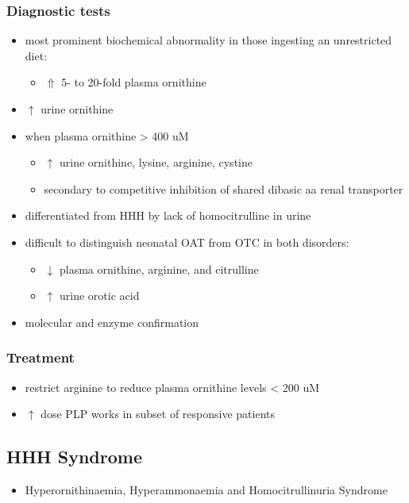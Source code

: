 \documentclass{scrartcl}
\begin{document}
\subsubsection{Diagnostic tests}
\label{sec:org4e855ef}
\begin{itemize}
\item most prominent biochemical abnormality in those ingesting an
unrestricted diet:
\begin{itemize}
\item \(\Uparrow\) 5- to 20-fold plasma ornithine
\end{itemize}
\item \(\uparrow\) urine ornithine
\item when plasma ornithine \textgreater{} 400 uM
\begin{itemize}
\item \(\uparrow\) urine ornithine, lysine, arginine, cystine
\item secondary to competitive inhibition of shared dibasic aa renal transporter
\end{itemize}
\item differentiated from HHH by lack of homocitrulline in urine
\item difficult to distinguish neonatal OAT from OTC in both disorders:
\begin{itemize}
\item \(\downarrow\) plasma ornithine, arginine, and citrulline
\item \(\uparrow\) urine orotic acid
\end{itemize}
\item molecular and enzyme confirmation
\end{itemize}

\subsubsection{Treatment}
\label{sec:org4390f24}
\begin{itemize}
\item restrict arginine to reduce plasma ornithine levels \textless{} 200 uM
\item \(\uparrow\) dose PLP works in subset of responsive patients
\end{itemize}

\subsection{HHH Syndrome}
\label{sec:org58964ce}
\begin{itemize}
\item Hyperornithinaemia, Hyperammonaemia and Homocitrullinuria Syndrome
\end{itemize}
\end{document}
